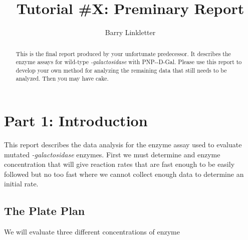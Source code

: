 \documentclass[]{tufte-handout}
\title{Tutorial \#X: Preminary Report}
\author[Barry Linkletter]{Barry Linkletter}
\date{} %
\begin{document}
\justifying


\maketitle%

\begin{abstract}
\noindent This is the final report produced by your unfortunate predecessor. It describes the enzyme assays for wild-type \emph{\textbeta -galactosidase} with PNP-\textbeta-D-Gal. Please use this report to develop your own method for analyzing the remaining data that still needs to be analyzed. Then you may have cake.

\end{abstract}





\section{Part 1: Introduction}

This report describes the data analysis for the enzyme assay used to evaluate mutated \emph{\textbeta -galactosidase} enzymes. First we must determine and enzyme concentration that will give reaction rates that are fast enough to be easily followed but no too fast where we cannot collect enough data to determine an initial rate. 

\subsection{The Plate Plan}

We will evaluate three different concentrations of enzyme
\end{document}
